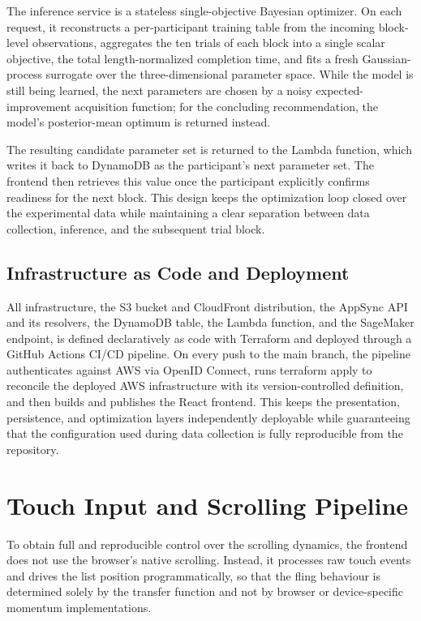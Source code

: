 The inference service is a stateless single-objective Bayesian optimizer. On each request, it reconstructs a per-participant training table from the incoming block-level observations, aggregates the ten trials of each block into a single scalar objective, the total length-normalized completion time, and fits a fresh Gaussian-process surrogate over the three-dimensional parameter space. While the model is still being learned, the next parameters are chosen by a noisy expected-improvement acquisition function; for the concluding recommendation, the model's posterior-mean optimum is returned instead.

The resulting candidate parameter set is returned to the Lambda function, which writes it back to DynamoDB as the participant's next parameter set. The frontend then retrieves this value once the participant explicitly confirms readiness for the next block. This design keeps the optimization loop closed over the experimental data while maintaining a clear separation between data collection, inference, and the subsequent trial block.

\subsection{Infrastructure as Code and Deployment}

All infrastructure, the S3 bucket and CloudFront distribution, the AppSync API and its resolvers, the DynamoDB table, the Lambda function, and the SageMaker endpoint, is defined declaratively as code with Terraform and deployed through a GitHub Actions CI/CD pipeline. On every push to the main branch, the pipeline authenticates against AWS via OpenID Connect, runs terraform apply to reconcile the deployed AWS infrastructure with its version-controlled definition, and then builds and publishes the React frontend. This keeps the presentation, persistence, and optimization layers independently deployable while guaranteeing that the configuration used during data collection is fully reproducible from the repository.

\section{Touch Input and Scrolling Pipeline}

To obtain full and reproducible control over the scrolling dynamics, the frontend does not use the browser's native scrolling. Instead, it processes raw touch events and drives the list position programmatically, so that the fling behaviour is determined solely by the transfer function and not by browser or device-specific momentum implementations.

